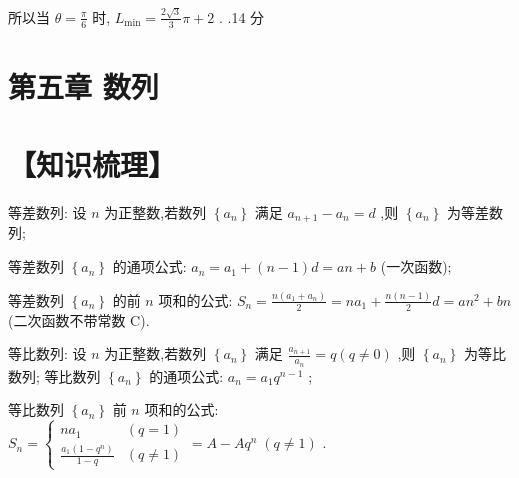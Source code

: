 \documentclass[10pt]{article}
\newcommand*\circled[1]{\tikz[baseline=(char.base)]{\node[shape=circle,draw,inner sep=1.5pt] (char) {\small #1};}}
\begin{document}
\begin{center}
\end{center}

所以当 \(\theta  = \frac{\pi }{6}\) 时, \({L}_{\min } = \frac{2\sqrt{3}}{3}\pi  + 2\) . .14 分

\section*{第五章 数列}

\section*{【知识梳理】}

 \circled{1}  等差数列: 设 \(n\) 为正整数,若数列 \(\left\{  {a}_{n}\right\}\) 满足 \({a}_{n + 1} - {a}_{n} = d\) ,则 \(\left\{  {a}_{n}\right\}\) 为等差数列;

等差数列 \(\left\{  {a}_{n}\right\}\) 的通项公式: \({a}_{n} = {a}_{1} + \left( {n - 1}\right) d = {an} + b\) (一次函数);

等差数列 \(\left\{  {a}_{n}\right\}\) 的前 \(n\) 项和的公式: \({S}_{n} = \frac{n\left( {{a}_{1} + {a}_{n}}\right) }{2} = n{a}_{1} + \frac{n\left( {n - 1}\right) }{2}d = a{n}^{2} + {bn}\) (二次函数不带常数 C).

 \circled{2}  等比数列: 设 \(n\) 为正整数,若数列 \(\left\{  {a}_{n}\right\}\) 满足 \(\frac{{a}_{n + 1}}{{a}_{n}} = q\left( {q \neq  0}\right)\) ,则 \(\left\{  {a}_{n}\right\}\) 为等比数列; 等比数列 \(\left\{  {a}_{n}\right\}\) 的通项公式: \({a}_{n} = {a}_{1}{q}^{n - 1}\) ;

等比数列 \(\left\{  {a}_{n}\right\}\) 前 \(n\) 项和的公式: \({S}_{n} = \left\{  {\begin{matrix} n{a}_{1} & \left( {q = 1}\right) \\  \frac{{a}_{1}\left( {1 - {q}^{n}}\right) }{1 - q} & \left( {q \neq  1}\right)  \end{matrix} = A - A{q}^{n}\;\left( {q \neq  1}\right) }\right.\) .
\end{document}
